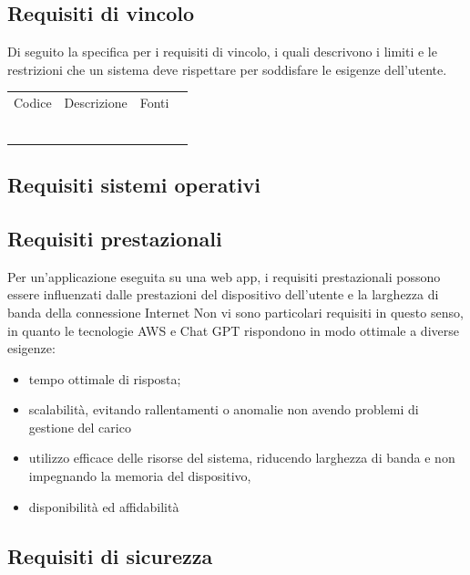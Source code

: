 \documentclass{article}
\begin{document}
\subsection{Requisiti di vincolo}
Di seguito la specifica per i requisiti di vincolo, i quali descrivono i limiti e le restrizioni che un sistema
deve rispettare per soddisfare le esigenze dell'utente. 
\begin{center}
    \begin{tabular}{|p{3cm}|p{6cm}|p{}|p{3cm}|}
    \rowcolor{Blue} 
\hline
Codice & Descrizione & Fonti  \\ 
\rowcolor{LightBlue}
\hline
& &  \\ 
\rowcolor{LighterBlue}
\hline
 & & \\ 
\rowcolor{LightBlue}
\hline
 & & \\
\hline
\rowcolor{LighterBlue}

& & \\
\rowcolor{LightBlue}
\hline
& & \\
\hline
\rowcolor{LighterBlue}

 & & \\
\hline
\end{tabular}
\end{center}

\subsection{Requisiti sistemi operativi}


\subsection{Requisiti prestazionali}
Per un'applicazione eseguita su una web app, i requisiti prestazionali possono essere influenzati dalle prestazioni del dispositivo dell'utente e la larghezza di banda della connessione Internet 
Non vi sono particolari requisiti in questo senso, in quanto le tecnologie AWS e Chat GPT rispondono in modo ottimale a diverse esigenze:
\begin{itemize}
\item tempo ottimale di risposta;
\item scalabilità, evitando rallentamenti o anomalie non avendo problemi di gestione del carico 
\item utilizzo efficace delle risorse del sistema, riducendo larghezza di banda e non impegnando la memoria del dispositivo, 
\item disponibilità ed affidabilità
\end{itemize}

\subsection{Requisiti di sicurezza}







   
\end{document}
